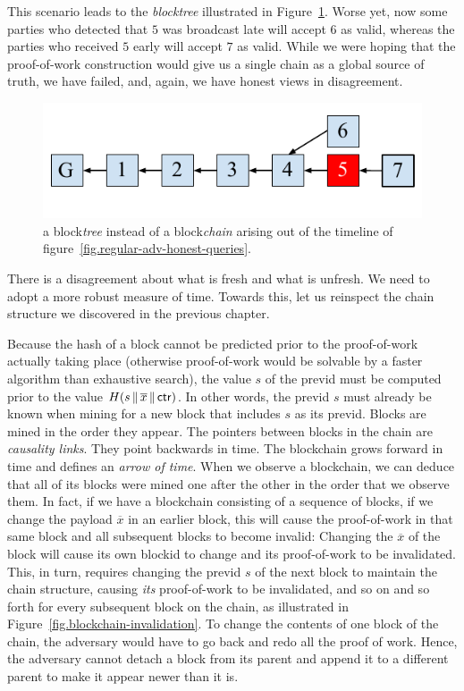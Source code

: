 This scenario leads to the \emph{blocktree} illustrated in Figure~\ref{fig.chain-fork}.
Worse yet, now some parties who detected that $5$ was broadcast late will accept $6$ as valid, whereas
the parties who received $5$ early will accept $7$ as valid. While we were hoping that the proof-of-work
construction would give us a single chain as a global source of truth, we have failed, and, again,
we have honest views in disagreement.

\begin{figure}[h]
    \centering
    \includegraphics[width=0.4 \columnwidth,keepaspectratio]{figures/chain-fork.pdf}
    \caption{a block\emph{tree} instead of a block\emph{chain} arising out of the timeline
             of figure~\ref{fig.regular-adv-honest-queries}.}
    \label{fig.chain-fork}
\end{figure}

There is a disagreement about what is fresh and what is unfresh. We need to adopt a more
robust measure of time. Towards this, let us reinspect the chain structure we discovered
in the previous chapter.

Because the hash of a block cannot be predicted prior to the proof-of-work actually taking place
(otherwise proof-of-work would be solvable by a faster algorithm than exhaustive search),
the value
$s$ of the previd must be computed prior to the value $H(s \,\|\, \overline{x} \,\|\, \mathsf{ctr})$.
In other words, the previd $s$ must already be known when mining for a new block that includes
$s$ as its previd. Blocks are mined in the order they appear. The pointers between blocks
in the chain are \emph{causality links}. They point backwards in time. The blockchain grows
forward in time and defines an \emph{arrow of time}. When we observe a blockchain, we can
deduce that all of its blocks were mined one after the other in the order that we observe
them. In fact, if we have a blockchain consisting of a sequence of blocks, if we change
the payload $\overline{x}$ in an earlier block, this will cause the proof-of-work in that
same block and all subsequent blocks to become invalid: Changing the $\overline{x}$ of the
block will cause its own blockid to change and its proof-of-work to be invalidated. This, in
turn, requires changing the previd $s$ of the next block to maintain the chain structure,
causing \emph{its} proof-of-work to
be invalidated, and so on and so forth for every subsequent block on the chain, as
illustrated in Figure~\ref{fig.blockchain-invalidation}. To change
the contents of one block of the chain, the adversary would have to go back and redo all
the proof of work. Hence, the adversary cannot detach a block from its parent and append
it to a different parent to make it appear newer than it is.

